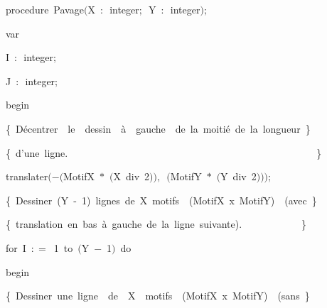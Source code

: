 {\pagebreak[3] 
\vspace{\neglskip}\mbox{\blc  \blk\idt  \mcl procedure\idt \ Pavage$($X\ $:$\ integer$;$\ Y\ $:$\ integer$)$$;$}\par 
\pagebreak[3] 
\vspace{\neglskip}\mbox{\blc  \blk\blk\idt  \mcl var\idt }\par 
\vspace{\neglskip}\mbox{\blc  \blk\blk\blk\idt  I\ $:$\ integer$;$}\par 
\vspace{\neglskip}\mbox{\blc  \blk\blk\blk\idt  J\ $:$\ integer$;$}\par 
\vspace{\neglskip}\mbox{\blc  \blk\idt  \mcl begin\idt }\par 
\vspace{\neglskip}\mbox{\blc  \blk\blk\idt  \cmt  \{\ Décentrer\ \ le\ \ dessin\ \ à\ \ gauche\ \ de\ la\ moitié\ de\ la\ longueur\ \}\idt }\par 
\vspace{\neglskip}\mbox{\blc  \blk\blk\idt  \cmt  \{\ d{'}une\ ligne.\ \ \ \ \ \ \ \ \ \ \ \ \ \ \ \ \ \ \ \ \ \ \ \ \ \ \ \ \ \ \ \ \ \ \ \ \ \ \ \ \ \ \ \ \ \ \ \ \ \ \}\idt }\par 
\vspace{\neglskip}\mbox{\blc  \blk\blk\idt  translater$($$-$$($MotifX\ $\ast$\ $($X\ \mcl div\idt \ 2$)$$)$$,$\ $($MotifY\ $\ast$\ $($Y\ \mcl div\idt \ 2$)$$)$$)$$;$}\par 
\vspace{\neglskip}\mbox{\blc  \blk\blk\idt  \cmt  \{\ Dessiner\ (Y\ -\ 1)\ lignes\ de\ X\ motifs\ \ (MotifX\ x\ MotifY)\ \ (avec\ \}\idt }\par 
\vspace{\neglskip}\mbox{\blc  \blk\blk\idt  \cmt  \{\ translation\ en\ bas\ à\ gauche\ de\ la\ ligne\ suivante).\ \ \ \ \ \ \ \ \ \ \ \ \}\idt }\par 
\pagebreak[3] 
\vspace{\neglskip}\mbox{\blc  \blk\blk\idt  \mcl for\idt \ I\ $:$$=$\ 1\ \mcl to\idt \ $($Y\ $-$\ 1$)$\ \mcl do\idt }\par 
\vspace{\neglskip}\mbox{\blc  \blk\blk\blk\idt  \mcl begin\idt }\par 
\vspace{\neglskip}\mbox{\blc  \blk\blk\blk\blk\idt  \cmt  \{\ Dessiner\ une\ ligne\ \ de\ \ X\ \ motifs\ \ (MotifX\ x\ MotifY)\ \ (sans\ \}\idt }\par 
}
